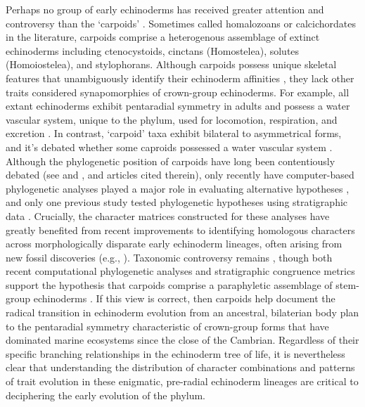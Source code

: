 \documentclass{article}
\begin{document}
Perhaps no group of early echinoderms has received greater attention and controversy than the `carpoids’ \citep{RahmanMakingSenseofCarpoids2009}. Sometimes called homalozoans or calcichordates in the literature, carpoids comprise a heterogenous assemblage of extinct echinoderms including ctenocystoids, cinctans (Homostelea), solutes (Homoiostelea), and stylophorans. Although carpoids possess unique skeletal features that unambiguously identify their echinoderm affinities \citep{DavidEtAl2000, Bottjer2006, RahmanMakingSenseofCarpoids2009, ZamoraEtAl2020}, they lack other traits considered synapomorphies of crown-group echinoderms. For example, all extant echinoderms exhibit pentaradial symmetry in adults and possess a water vascular system, unique to the phylum, used for locomotion, respiration, and excretion \citep{Nichols1972}.  In contrast, ‘carpoid’ taxa exhibit bilateral to asymmetrical forms, and it’s debated whether some caproids possessed a water vascular system \citep{Smith2005, LefebvreEtAl2019}. Although the phylogenetic position of carpoids have long been contentiously debated (see \citealp{RahmanMakingSenseofCarpoids2009} and \citealp{Rahman2009b}, and articles cited therein), only recently have computer-based phylogenetic analyses played a major role in evaluating alternative hypotheses \citep{Sumrall1997, SmithAndZamora2013, ZamoraRahman2014}, and only one previous study tested phylogenetic hypotheses using stratigraphic data \citep{Rahman2009b}. Crucially, the character matrices constructed for these analyses have greatly benefited from recent improvements to identifying homologous characters across morphologically disparate early echinoderm lineages, often arising from new fossil discoveries (e.g., \citealp{ZamoraEtAl2012, SmithAndZamora2013}). Taxonomic controversy remains \citep{DavidEtAl2000}, though both recent computational phylogenetic analyses and stratigraphic congruence metrics support the hypothesis that carpoids comprise a paraphyletic assemblage of stem-group echinoderms \citep{Rahman2009b, SmithAndZamora2013, ZamoraRahman2014}. If this view is correct, then carpoids help document the radical transition in echinoderm evolution from an ancestral, bilaterian body plan to the pentaradial symmetry characteristic of crown-group forms that have dominated marine ecosystems since the close of the Cambrian. Regardless of their specific branching relationships in the echinoderm tree of life, it is nevertheless clear that understanding the distribution of character combinations and patterns of trait evolution in these enigmatic, pre-radial echinoderm lineages are critical to deciphering the early evolution of the phylum.
\end{document}

